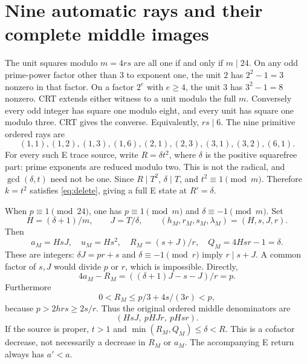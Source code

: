 \section{Nine automatic rays and their complete middle images}\label{sec:auto}
The unit squares modulo $m=4rs$ are all one if and only if $m\mid24$.
On any odd prime-power factor other than $3$ to exponent one, the unit $2$
has $2^2-1=3$ nonzero in that factor. On a factor $2^e$ with $e\ge4$, the
unit $3$ has $3^2-1=8$ nonzero. CRT extends either witness to a unit modulo
the full $m$. Conversely every odd integer has square one modulo eight,
and every unit has square one modulo three. CRT gives the converse. Equivalently, $rs\mid6$.
The nine primitive ordered rays are
\[
 (1,1),(1,2),(1,3),(1,6),(2,1),(2,3),(3,1),(3,2),(6,1).
\]
For every such E trace source, write $R=\delta t^2$, where $\delta$ is the
positive squarefree part: prime exponents are reduced modulo two. This is not
the radical, and $\gcd(\delta,t)$ need not be one. Since $R\mid T^2$,
$\delta\mid T$, and $t^2\equiv1\pmod m$. Therefore $k=t^2$ satisfies
\eqref{eq:delete}, giving a full E state at $R'=\delta$.

When $p\equiv1\pmod{24}$, one has $p\equiv1\pmod m$ and
$\delta\equiv-1\pmod m$. Set
\begin{equation}\label{eq:Mreturn}
 H=(\delta+1)/m,\qquad J=T/\delta,\qquad
 (h_M,r_M,s_M,\lambda_M)=(H,s,J,r).
\end{equation}
Then
\[
 a_M=HsJ,\quad u_M=Hs^2,\quad R_M=(s+J)/r,\quad Q_M=4Hsr-1=\delta.
\]
These are integers: $\delta J=pr+s$ and $\delta\equiv-1\pmod r$ imply
$r\mid s+J$. A common factor of $s,J$ would divide $p$ or $r$, which is
impossible. Directly,
\[
 4a_M-R_M=((\delta+1)J-s-J)/r=p.
\]
Furthermore
\[
 0<R_M\le p/3+4s/(3r)<p,
\]
because $p>2hrs\ge2s/r$. Thus the original ordered middle denominators are
\begin{equation}\label{eq:MDenom}
 (HsJ,\ pHJr,\ pHsr).
\end{equation}
If the source is proper, $t>1$ and
$\min(R_M,Q_M)\le\delta<R$. This is a cofactor decrease, not necessarily
a decrease in $R_M$ or $a_M$. The accompanying E return always has $a'<a$.

